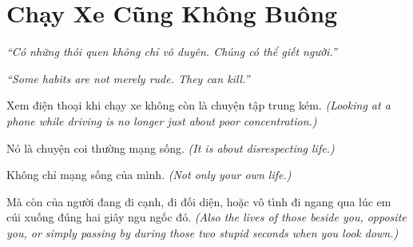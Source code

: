 \chapter{Chạy Xe Cũng Không Buông}

\begin{center}
	\textit{\color{bookprimary}``Có những thói quen không chỉ vô duyên. Chúng có thể giết người.''}

	\textit{\color{bookprimary}``Some habits are not merely rude. They can kill.''}
\end{center}

\ngancach

\begin{tcolorbox}[colback=booksecondary!8,colframe=booksecondary!40,arc=5pt,title={\bfseries Góc Suy Nghĩ},fonttitle=\bfseries\color{booksecondary}]
Xem điện thoại khi chạy xe không còn là chuyện tập trung kém.
\textit{(Looking at a phone while driving is no longer just about poor concentration.)}

Nó là chuyện coi thường mạng sống.
\textit{(It is about disrespecting life.)}

Không chỉ mạng sống của mình.
\textit{(Not only your own life.)}

Mà còn của người đang đi cạnh, đi đối diện, hoặc vô tình đi ngang qua lúc em cúi xuống đúng hai giây ngu ngốc đó.
\textit{(Also the lives of those beside you, opposite you, or simply passing by during those two stupid seconds when you look down.)}
\end{tcolorbox}

